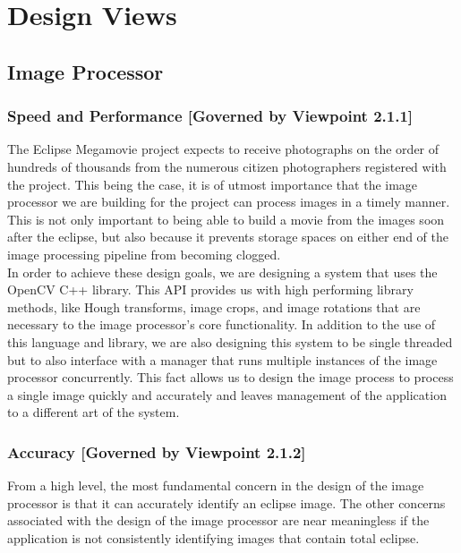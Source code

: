 \documentclass[10pt, onecolumn, draftclsnofoot, letterpaper, compsoc]{IEEEtran}
\begin{document}
\section{Design Views}

\subsection{Image Processor}

\subsubsection{Speed and Performance [Governed by Viewpoint 2.1.1]}

The Eclipse Megamovie project expects to receive photographs on the order of
hundreds of thousands from the numerous citizen photographers registered with
the project. This being the case, it is of utmost importance that the image
processor we are building for the project can process images in a timely manner.
This is not only important to being able to build a movie from the images soon
after the eclipse, but also because it prevents storage spaces on either end of
the image processing pipeline from becoming clogged. \\

In order to achieve these design goals, we are designing a system that uses the
OpenCV C++ library.  This API provides us with high performing library methods,
like Hough transforms, image crops, and image rotations that are necessary to
the image processor's core functionality. In addition to the use of this
language and library, we are also designing this system to be single threaded
but to also interface with a manager that runs multiple instances of the image
processor concurrently. This fact allows us to design the image process to
process a single image quickly and accurately and leaves management of the
application to a different art of the system.\\

\subsubsection{Accuracy [Governed by Viewpoint 2.1.2]}

From a high level, the most fundamental concern in the design of the image
processor is that it can accurately identify an eclipse image. The other
concerns associated with the design of the image processor are near meaningless
if the application is not consistently identifying images that contain total
eclipse.\\
\end{document}
